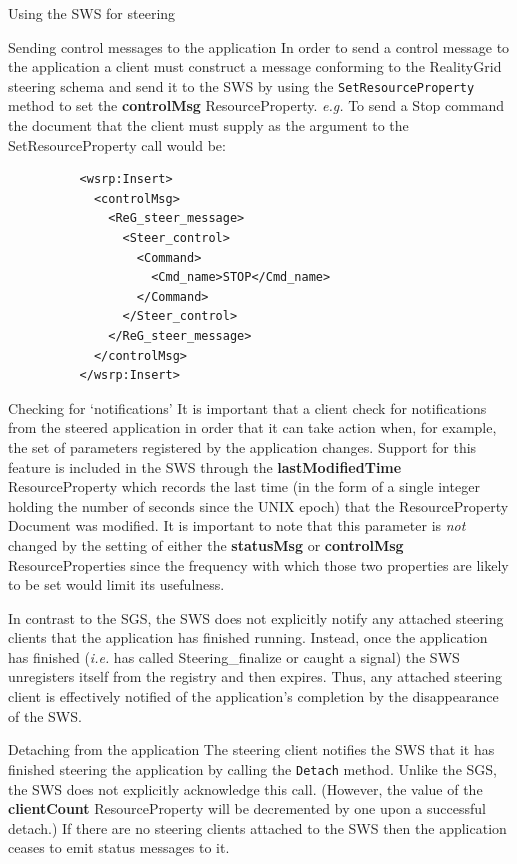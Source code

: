 \documentclass[a4paper]{article}
\begin{document}
\begin{section}{Using the SWS for steering}
\begin{subsection}{Sending control messages to the application}
In order to send a control message to the application a client must
construct a message conforming to the RealityGrid steering schema and
send it to the SWS by using the \texttt{SetResourceProperty} method to
set the {\bf controlMsg} ResourceProperty. {\it e.g.} To send a Stop
command the document that the client must supply as the argument to
the SetResourceProperty call would be:
\begin{verbatim}
          <wsrp:Insert>
            <controlMsg>
              <ReG_steer_message>
                <Steer_control>
                  <Command>
                    <Cmd_name>STOP</Cmd_name>
                  </Command>
                </Steer_control>
              </ReG_steer_message>
            </controlMsg>
          </wsrp:Insert>
\end{verbatim}
\end{subsection}

\begin{subsection}{Checking for `notifications'}
\label{sec:notification}
It is important that a client check for notifications from the steered
application in order that it can take action when, for example, the
set of parameters registered by the application changes.  Support for
this feature is included in the SWS through the {\bf lastModifiedTime}
ResourceProperty which records the last time (in the form of a single
integer holding the number of seconds since the UNIX epoch) that the
ResourceProperty Document was modified.  It is important to note that
this parameter is {\em not} changed by the setting of either the {\bf
statusMsg} or {\bf controlMsg} ResourceProperties since the frequency
with which those two properties are likely to be set would limit its
usefulness.

In contrast to the SGS, the SWS does not explicitly notify any
attached steering clients that the application has finished running.
Instead, once the application has finished ({\it i.e.} has called
Steering\_finalize or caught a signal) the SWS unregisters itself from
the registry and then expires.  Thus, any attached steering client is
effectively notified of the application's completion by the
disappearance of the SWS.
\end{subsection}

\begin{subsection}{Detaching from the application}
The steering client notifies the SWS that it has finished steering the
application by calling the \texttt{Detach} method.  Unlike the SGS, the
SWS does not explicitly acknowledge this call.  (However, the value of
the {\bf clientCount} ResourceProperty will be decremented by one upon
a successful detach.)  If there are no steering clients attached to
the SWS then the application ceases to emit status messages to it.
\end{subsection}

\end{section}
\end{document}

